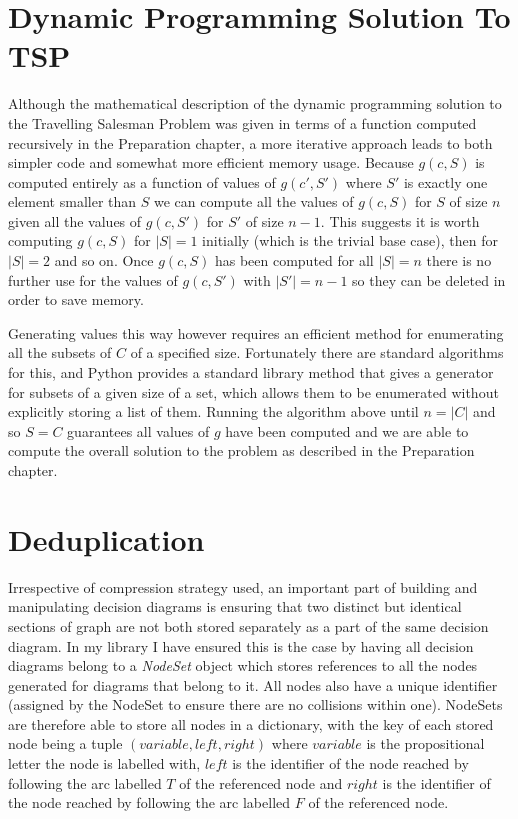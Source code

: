 \documentclass[12pt,a4paper,twoside,openright]{report}
\begin{document}
\section{Dynamic Programming Solution To TSP}
Although the mathematical description of the dynamic programming solution to the Travelling Salesman Problem was given in terms of a function computed recursively in the Preparation chapter, a more iterative approach leads to both simpler code and somewhat more efficient memory usage. Because $g(c, S)$ is computed entirely as a function of values of $g(c', S')$ where $S'$ is exactly one element smaller than $S$ we can compute all the values of $g(c, S)$ for $S$ of size $n$ given all the values of $g(c,S')$ for $S'$ of size $n-1$. This suggests it is worth computing $g(c,S)$ for $|S|=1$ initially (which is the trivial base case), then for $|S|=2$ and so on. Once $g(c,S)$ has been computed for all $|S|=n$ there is no further use for the values of $g(c,S')$ with $|S'|=n-1$ so they can be deleted in order to save memory. 

Generating values this way however requires an efficient method for enumerating all the subsets of $C$ of a specified size. Fortunately there are standard algorithms for this, and Python provides a standard library method that gives a generator for subsets of a given size of a set, which allows them to be enumerated without explicitly storing a list of them. Running the algorithm above until $n=|C|$ and so $S=C$ guarantees all values of $g$ have been computed and we are able to compute the overall solution to the problem as described in the Preparation chapter.

\section{Deduplication}
Irrespective of compression strategy used, an important part of building and manipulating decision diagrams is ensuring that two distinct but identical sections of graph are not both stored separately as a part of the same decision diagram. In my library I have ensured this is the case by having all decision diagrams belong to a \textit{NodeSet} object which stores references to all the nodes generated for diagrams that belong to it. All nodes also have a unique identifier (assigned by the NodeSet to ensure there are no collisions within one). NodeSets are therefore able to store all nodes in a dictionary, with the key of each stored node being a tuple $(\mathit{variable}, \mathit{left}, \mathit{right})$ where $\mathit{variable}$ is the propositional letter the node is labelled with, $\mathit{left}$ is the identifier of the node reached by following the arc labelled $T$ of the referenced node and $\mathit{right}$ is the identifier of the node reached by following the arc labelled $F$ of the referenced node.
\end{document}
